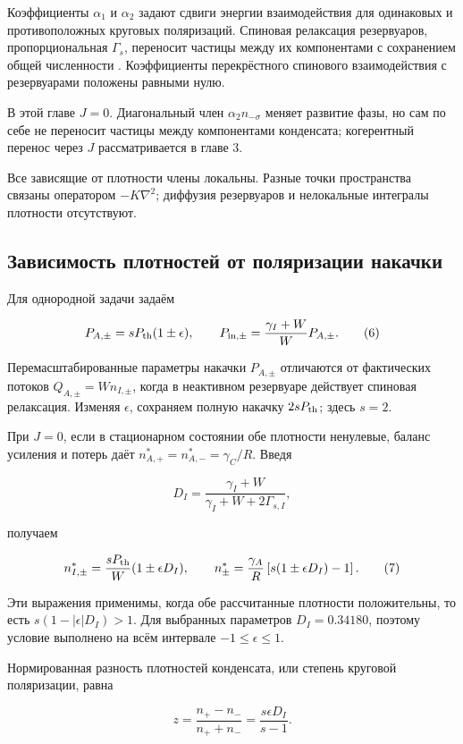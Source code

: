 \documentclass[12pt,a4paper]{article}
\begin{document}
Коэффициенты \(\alpha_1\) и \(\alpha_2\) задают сдвиги энергии взаимодействия для одинаковых и противоположных круговых поляризаций. Спиновая релаксация резервуаров, пропорциональная \(\Gamma_s\), переносит частицы между их компонентами с сохранением общей численности \cite{ref3}. Коэффициенты перекрёстного спинового взаимодействия с резервуарами положены равными нулю.

В этой главе \(J=0\). Диагональный член \(\alpha_2n_{-\sigma}\) меняет развитие фазы, но сам по себе не переносит частицы между компонентами конденсата; когерентный перенос через \(J\) рассматривается в главе 3.

Все зависящие от плотности члены локальны. Разные точки пространства связаны оператором \(-K\nabla^2\); диффузия резервуаров и нелокальные интегралы плотности отсутствуют.

\subsection{Зависимость плотностей от поляризации накачки}

Для однородной задачи задаём

\[
P_{A,\pm}=sP_{\rm th}(1\pm\epsilon),\qquad
P_{{\rm in},\pm}=\frac{\gamma_I+W}{W}P_{A,\pm}.
\tag{6}\label{eq:6}
\]

Перемасштабированные параметры накачки \(P_{A,\pm}\) отличаются от фактических потоков \(Q_{A,\pm}=Wn_{I,\pm}\), когда в неактивном резервуаре действует спиновая релаксация. Изменяя \(\epsilon\), сохраняем полную накачку \(2sP_{\rm th}\); здесь \(s=2\).

При \(J=0\), если в стационарном состоянии обе плотности ненулевые, баланс усиления и потерь даёт \(n_{A,+}^*=n_{A,-}^*=\gamma_C/R\). Введя

\[
D_I=\frac{\gamma_I+W}{\gamma_I+W+2\Gamma_{s,I}},
\]

получаем

\[
n_{I,\pm}^*=\frac{sP_{\rm th}}{W}(1\pm\epsilon D_I),
\qquad
n_\pm^*=\frac{\gamma_A}{R}\left[s(1\pm\epsilon D_I)-1\right].
\tag{7}\label{eq:7}
\]

Эти выражения применимы, когда обе рассчитанные плотности положительны, то есть \(s(1-|\epsilon|D_I)>1\). Для выбранных параметров \(D_I=0.34180\), поэтому условие выполнено на всём интервале \(-1\le\epsilon\le1\).

Нормированная разность плотностей конденсата, или степень круговой поляризации, равна

\[
z=\frac{n_+-n_-}{n_++n_-}=\frac{s\epsilon D_I}{s-1}.
\tag{8}\label{eq:8}
\]
\end{document}
